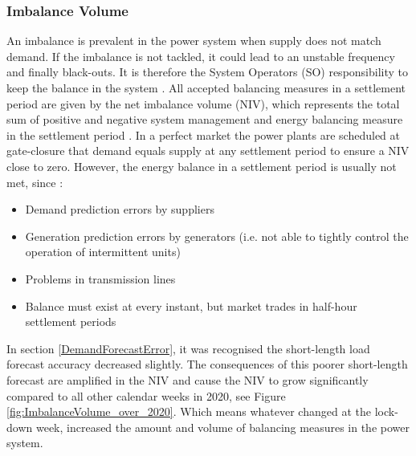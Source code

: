 \documentclass[energies,article,submit,moreauthors,pdftex]{Definitions/mdpi}
\begin{document}

\subsubsection{Imbalance Volume}\label{section:ImbalanceVolume}

An imbalance is prevalent in the power system when supply does not match demand. If the imbalance is not tackled, it could lead to an unstable frequency and finally black-outs. It is therefore the System Operators (SO) responsibility to keep the balance in the system \cite{ELEXON2020ELEXONBMRS}. All accepted balancing measures in a settlement period are given by the net imbalance volume (NIV), which represents the total sum of positive and negative system management and energy balancing measure in the settlement period \cite{ELEXON2020ELEXONBMRS}. In a perfect market the power plants are scheduled at gate-closure that demand equals supply at any settlement period to ensure a NIV close to zero. However, the energy balance in a settlement period is usually not met, since \cite{ELEXON2019GuidanceBritain}:
\begin{itemize}
    \item Demand prediction errors by suppliers
    \item Generation prediction errors by generators (i.e. not able to tightly control the operation of intermittent units)
    \item Problems in transmission lines
    \item Balance must exist at every instant, but market trades in half-hour settlement periods 
\end{itemize}

In section \ref{DemandForecastError}, it was recognised the short-length load forecast accuracy decreased slightly. The consequences of this poorer short-length forecast are amplified in the NIV and cause the NIV to grow significantly compared to all other calendar weeks in 2020, see Figure \ref{fig:ImbalanceVolume_over_2020}. Which means whatever changed at the lock-down week, increased the amount and volume of balancing measures in the power system.
\end{document}
